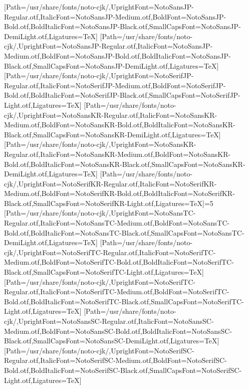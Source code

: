 \newfontfamily{}[Path=/usr/share/fonts/noto-cjk/,UprightFont=NotoSansJP-Regular.otf,ItalicFont=NotoSansJP-Medium.otf,BoldFont=NotoSansJP-Bold.otf,BoldItalicFont=NotoSansJP-Black.otf,SmallCapsFont=NotoSansJP-DemiLight.otf,Ligatures=TeX]
\newfontfamily{}[Path=/usr/share/fonts/noto-cjk/,UprightFont=NotoSansJP-Regular.otf,ItalicFont=NotoSansJP-Medium.otf,BoldFont=NotoSansJP-Bold.otf,BoldItalicFont=NotoSansJP-Black.otf,SmallCapsFont=NotoSansJP-DemiLight.otf,Ligatures=TeX]
\newfontfamily{}[Path=/usr/share/fonts/noto-cjk/,UprightFont=NotoSerifJP-Regular.otf,ItalicFont=NotoSerifJP-Medium.otf,BoldFont=NotoSerifJP-Bold.otf,BoldItalicFont=NotoSerifJP-Black.otf,SmallCapsFont=NotoSerifJP-Light.otf,Ligatures=TeX]
\newfontfamily{}[Path=/usr/share/fonts/noto-cjk/,UprightFont=NotoSansKR-Regular.otf,ItalicFont=NotoSansKR-Medium.otf,BoldFont=NotoSansKR-Bold.otf,BoldItalicFont=NotoSansKR-Black.otf,SmallCapsFont=NotoSansKR-DemiLight.otf,Ligatures=TeX]
\newfontfamily{}[Path=/usr/share/fonts/noto-cjk/,UprightFont=NotoSansKR-Regular.otf,ItalicFont=NotoSansKR-Medium.otf,BoldFont=NotoSansKR-Bold.otf,BoldItalicFont=NotoSansKR-Black.otf,SmallCapsFont=NotoSansKR-DemiLight.otf,Ligatures=TeX]
\newfontfamily{}[Path=/usr/share/fonts/noto-cjk/,UprightFont=NotoSerifKR-Regular.otf,ItalicFont=NotoSerifKR-Medium.otf,BoldFont=NotoSerifKR-Bold.otf,BoldItalicFont=NotoSerifKR-Black.otf,SmallCapsFont=NotoSerifKR-Light.otf,Ligatures=TeX]\else\ifnum\value{NotoCJKFamily}=5
\newfontfamily{}[Path=/usr/share/fonts/noto-cjk/,UprightFont=NotoSansTC-Regular.otf,ItalicFont=NotoSansTC-Medium.otf,BoldFont=NotoSansTC-Bold.otf,BoldItalicFont=NotoSansTC-Black.otf,SmallCapsFont=NotoSansTC-DemiLight.otf,Ligatures=TeX]
\newfontfamily{}[Path=/usr/share/fonts/noto-cjk/,UprightFont=NotoSerifTC-Regular.otf,ItalicFont=NotoSerifTC-Medium.otf,BoldFont=NotoSerifTC-Bold.otf,BoldItalicFont=NotoSerifTC-Black.otf,SmallCapsFont=NotoSerifTC-Light.otf,Ligatures=TeX]
\newfontfamily{}[Path=/usr/share/fonts/noto-cjk/,UprightFont=NotoSerifTC-Regular.otf,ItalicFont=NotoSerifTC-Medium.otf,BoldFont=NotoSerifTC-Bold.otf,BoldItalicFont=NotoSerifTC-Black.otf,SmallCapsFont=NotoSerifTC-Light.otf,Ligatures=TeX]
\newfontfamily{}[Path=/usr/share/fonts/noto-cjk/,UprightFont=NotoSansSC-Regular.otf,ItalicFont=NotoSansSC-Medium.otf,BoldFont=NotoSansSC-Bold.otf,BoldItalicFont=NotoSansSC-Black.otf,SmallCapsFont=NotoSansSC-DemiLight.otf,Ligatures=TeX]
\newfontfamily{}[Path=/usr/share/fonts/noto-cjk/,UprightFont=NotoSerifSC-Regular.otf,ItalicFont=NotoSerifSC-Medium.otf,BoldFont=NotoSerifSC-Bold.otf,BoldItalicFont=NotoSerifSC-Black.otf,SmallCapsFont=NotoSerifSC-Light.otf,Ligatures=TeX]

